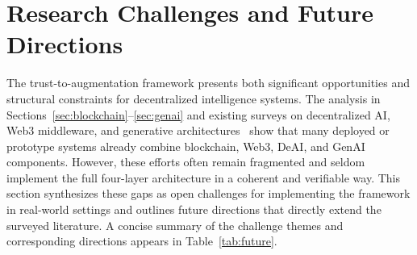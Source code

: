 \documentclass[5p,twocolumn]{elsarticle}
\begin{document}
\section{Research Challenges and Future Directions} \label{sec:future}
The trust-to-augmentation framework presents both significant opportunities and structural constraints for decentralized intelligence systems. The analysis in Sections~\ref{sec:blockchain}--\ref{sec:genai} and existing surveys on decentralized AI, Web3 middleware, and generative architectures~\cite{xu2024survey,savadatti2025survey,choi2025technological,luo2024survey,javadpour2024decentralized,wang2024sok} show that many deployed or prototype systems already combine blockchain, Web3, DeAI, and GenAI components. However, these efforts often remain fragmented and seldom implement the full four-layer architecture in a coherent and verifiable way. This section synthesizes these gaps as open challenges for implementing the framework in real-world settings and outlines future directions that directly extend the surveyed literature. A concise summary of the challenge themes and corresponding directions appears in Table~\ref{tab:future}.
\end{document}

